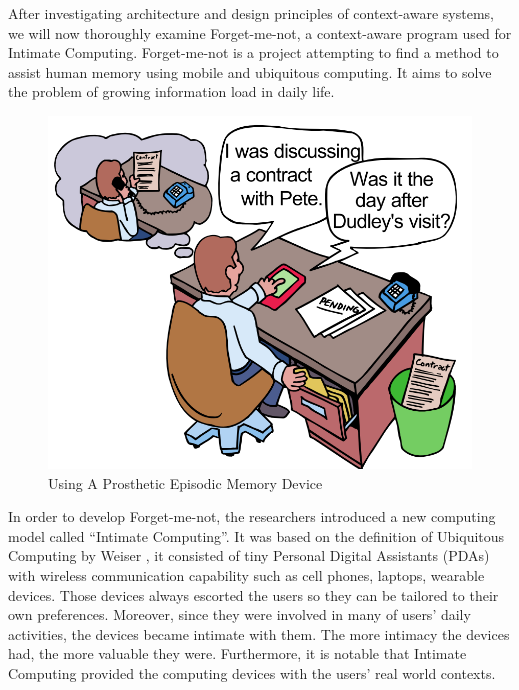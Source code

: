 After investigating architecture and design principles of context-aware systems, we will now thoroughly examine Forget-me-not, a context-aware program used for Intimate Computing. Forget-me-not \cite{lamming1994forget} is a project attempting to find a method to assist human memory using mobile and ubiquitous computing. It aims to solve the problem of growing information load in daily life.

\begin{figure}[!h]
\begin{centering}
\includegraphics[scale=0.45]{pics/episodic_device}
\caption{Using A Prosthetic Episodic Memory Device}\label{fig:episodic_device}
\end{centering}
\end{figure}

In order to develop Forget-me-not, the researchers introduced a new computing model called ``Intimate Computing''. It was based on the definition of Ubiquitous Computing by Weiser \cite{weiser1991computer}, it consisted of tiny Personal Digital Assistants (PDAs) with wireless communication capability such as cell phones, laptops, wearable devices. Those devices always escorted the users so they can be tailored to their own preferences. Moreover, since they were involved in many of users' daily activities, the devices became intimate with them. The more intimacy the devices had, the more valuable they were. Furthermore, it is notable that Intimate Computing provided the computing devices with the users' real world contexts.

